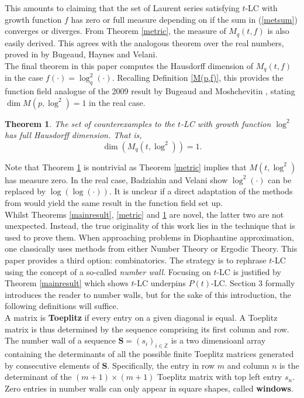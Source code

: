 \documentclass{article}
\newtheorem{theorem}{Theorem}[subsection]
\theoremstyle{definition}
\newcommand{\Z}{\mathbb{Z}}
\numberwithin{equation}{subsection}
\begin{document}
\noindent This amounts to claiming that the set of Laurent series satisfying $t$-LC with growth function $f$ has zero or full measure depending on if the sum in (\ref{metsum}) converges or diverges. From Theorem \ref{metric}, the measure of $M_q(t,f)$ is also easily derived. This agrees with the analogous theorem over the real numbers, proved in \cite{Metric} by Bugeaud, Haynes and Velani. \\

\noindent The final theorem in this paper computes the Hausdorff dimension of $M_q(t,f)$ in the case $f(\cdot)=\log_q^2(\cdot)$. Recalling Definition \ref{M(p,f)}, this provides the function field analogue of the 2009 result by Bugeaud and Moshchevitin \cite{log2CE}, stating $\dim M(p,\log^2)=1$ in the real case. 
 \begin{theorem}\label{log2}
The set of counterexamples to the $t$-LC with growth function $\log^2$ has full Hausdorff dimension. That is, $$\dim(M_q(t,\log^2))=1.$$
 \end{theorem}
 \noindent Note that Theorem \ref{log2} is nontrivial as Theorem \ref{metric} implies that $M(t,\log^2)$ has measure zero. In the real case, Badziahin and Velani \cite{cantor} show $\log^2(\cdot)$ can be replaced by $\log(\log(\cdot))$. It is unclear if a direct adaptation of the methods from \cite{cantor} would yield the same result in the function field set up.  \\

 \noindent Whilst Theorems \ref{mainresult}, \ref{metric} and \ref{log2} are novel, the latter two are not unexpected. Instead, the true originality of this work lies in the technique that is used to prove them. When approaching problems in Diophantine approximation, one classically uses methods from either Number Theory or Ergodic Theory. This paper provides a third option: combinatorics. The strategy is to rephrase $t$-LC using the concept of a so-called \textit{number wall}. Focusing on $t$-LC is justified by Theorem \ref{mainresult} which shows $t$-LC underpins $P(t)$-LC. Section 3 formally introduces the reader to number walls, but for the sake of this introduction, the following definitions will suffice. \\
 
 \noindent A matrix is \textbf{Toeplitz} if every entry on a given diagonal is equal. A Toeplitz matrix is thus determined by the sequence comprising its first column and row. The number wall of a sequence $\mathbf{S}=(s_i)_{i\in\Z}$ is a two dimensioanl array containing the determinants of all the possible finite Toeplitz matrices generated by consecutive elements of $\mathbf{S}$. Specifically, the entry in row $m$ and column $n$ is the determinant of the $(m+1)\times (m+1)$ Toeplitz matrix with top left entry $s_{n}$. Zero entries in number walls can only appear in square shapes, called \textbf{windows}. \\
\end{document}
